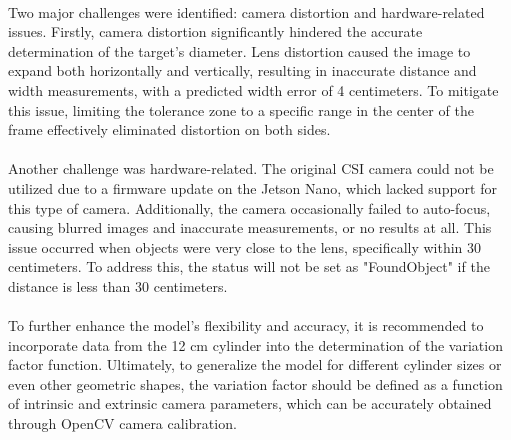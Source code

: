 \paragraph*{}
Two major challenges were identified: camera distortion and hardware-related issues. Firstly, camera distortion significantly hindered the accurate determination of the target's diameter. Lens distortion caused the image to expand both horizontally and vertically, resulting in inaccurate distance and width measurements, with a predicted width error of 4 centimeters. To mitigate this issue, limiting the tolerance zone to a specific range in the center of the frame effectively eliminated distortion on both sides.

\paragraph*{}
Another challenge was hardware-related. The original CSI camera could not be utilized due to a firmware update on the Jetson Nano, which lacked support for this type of camera. Additionally, the camera occasionally failed to auto-focus, causing blurred images and inaccurate measurements, or no results at all. This issue occurred when objects were very close to the lens, specifically within 30 centimeters. To address this, the status will not be set as "FoundObject" if the distance is less than 30 centimeters.

\paragraph*{}
To further enhance the model's flexibility and accuracy, it is recommended to incorporate data from the 12 cm cylinder into the determination of the variation factor function. Ultimately, to generalize the model for different cylinder sizes or even other geometric shapes, the variation factor should be defined as a function of intrinsic and extrinsic camera parameters, which can be accurately obtained through OpenCV camera calibration.
